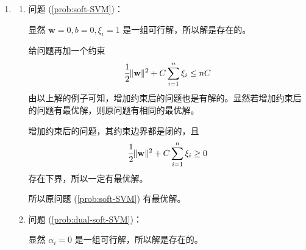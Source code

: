 \documentclass[11pt,letter,notitlepage]{article}
\begin{document}
\begin{solution}
	\begin{enumerate}
		\item \begin{enumerate}
			      \item 问题 (\ref{prob:soft-SVM})：

			            显然 $\mathbf{w}=0,b=0,\xi_i=1$ 是一组可行解，所以解是存在的。

			            给问题再加一个约束
			            $$\cfrac{1}{2}\|\mathbf{w}\|^2+C\sum_{i=1}^n\xi_i \leq nC$$
			            由以上解的例子可知，增加约束后的问题也是有解的。显然若增加约束后的问题有最优解，则原问题有相同的最优解。

			            增加约束后的问题，其约束边界都是闭的，且
			            $$\cfrac{1}{2}\|\mathbf{w}\|^2+C\sum_{i=1}^n\xi_i\geq0$$
			            存在下界，所以一定有最优解。

			            所以原问题 (\ref{prob:soft-SVM}) 有最优解。
			      \item 问题 (\ref{prob:dual-soft-SVM})：

			            显然 $\alpha_i=0$ 是一组可行解，所以解是存在的。


\end{enumerate}
\end{enumerate}
\end{solution}
\end{document}
